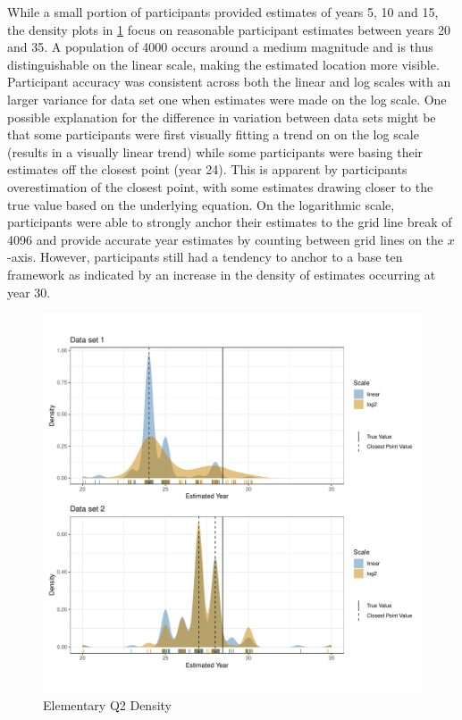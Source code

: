 \documentclass[print]{nuthesis}
\begin{document}
While a small portion of participants provided estimates of years 5, 10 and 15, the density plots in \cref{fig:qe2-density-plot} focus on reasonable participant estimates between years 20 and 35.
A population of 4000 occurs around a medium magnitude and is thus distinguishable on the linear scale, making the estimated location more visible.
Participant accuracy was consistent across both the linear and log scales with an larger variance for data set one when estimates were made on the log scale.
One possible explanation for the difference in variation between data sets might be that some participants were first visually fitting a trend on on the log scale (results in a visually linear trend) while some participants were basing their estimates off the closest point (year 24).
This is apparent by participants overestimation of the closest point, with some estimates drawing closer to the true value based on the underlying equation.
On the logarithmic scale, participants were able to strongly anchor their estimates to the grid line break of 4096 and provide accurate year estimates by counting between grid lines on the \(x\)-axis.
However, participants still had a tendency to anchor to a base ten framework as indicated by an increase in the density of estimates occurring at year 30.

\begin{figure}[tbp]

{\centering \includegraphics[width=1\linewidth,]{thesis_files/figure-latex/qe2-density-plot-1} 

}

\caption{Elementary Q2 Density}\label{fig:qe2-density-plot}
\end{figure}
\end{document}
